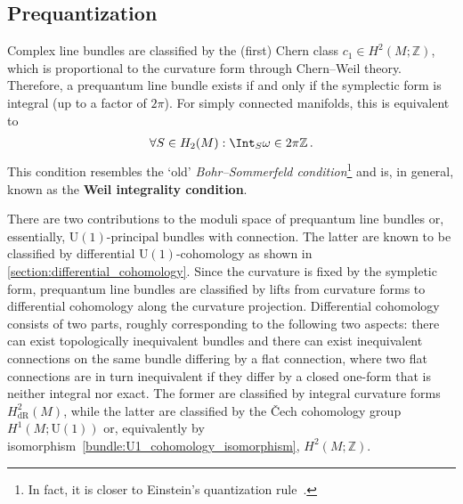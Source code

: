 \subsection{Prequantization}

    \begin{property}
        Complex line bundles are classified by the (first) Chern class $c_1\in H^2(M;\mathbb{Z})$, which is proportional to the curvature form through Chern--Weil theory. Therefore, a prequantum line bundle exists if and only if the symplectic form is integral (up to a factor of $2\pi$). For simply connected manifolds, this is equivalent to
        \begin{gather}
            \forall S\in H_2(M):\Int_S\omega\in 2\pi\mathbb{Z}\,.
        \end{gather}
        This condition resembles the `old' \textit{Bohr--Sommerfeld condition}\footnote{In fact, it is closer to Einstein's quantization rule~\citep{stone_einsteins_2005}.} and is, in general, known as the \textbf{Weil integrality condition}.

        There are two contributions to the moduli space of prequantum line bundles or, essentially, $\mathrm{U}(1)$-principal bundles with connection. The latter are known to be classified by differential $\mathrm{U}(1)$-cohomology as shown in \cref{section:differential_cohomology}. Since the curvature is fixed by the sympletic form, prequantum line bundles are classified by lifts from curvature forms to differential cohomology along the curvature projection. Differential cohomology consists of two parts, roughly corresponding to the following two aspects: there can exist topologically inequivalent bundles and there can exist inequivalent connections on the same bundle differing by a flat connection, where two flat connections are in turn inequivalent if they differ by a closed one-form that is neither integral nor exact. The former are classified by integral curvature forms $H^2_{\text{dR}}(M)$, while the latter are classified by the \v{C}ech cohomology group $H^1(M;\mathrm{U}(1))$ or, equivalently by isomorphism~\eqref{bundle:U1_cohomology_isomorphism}, $H^2(M;\mathbb{Z})$.
    \end{property}
